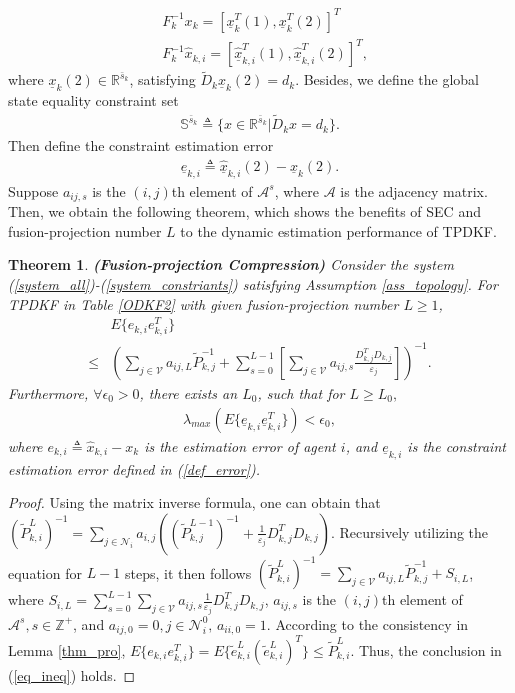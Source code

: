 \documentclass[journal,transmag]{IEEEtran}
\newtheorem{theorem}{\textbf{Theorem}}
\begin{document}
{\begin{align*}
&F_{k}^{-1}x_{k}=[\underline x_{k}^T(1),\underline x_{k}^T(2)]^T\\
&F_{k}^{-1}\hat x_{k,i}=[\underline {\hat x}_{k,i}^T(1),\underline {\hat x}_{k,i}^T(2)]^T,
\end{align*}
where $\underline x_{k}(2)\in\mathbb{R}^{\bar s_k}$, satisfying $\tilde D_{k}\underline x_{k}(2)= d_k$.
Besides, we define the  global state equality constraint set
\begin{align}\label{eq_space}
\mathbb{S}^{\bar s_k}\triangleq\{x\in\mathbb{R}^{\bar s_k}|\tilde D_{k}x= d_k\}.
\end{align}
Then define the constraint estimation error  
\begin{align}\label{def_error}
\underline e_{k,i}\triangleq \underline {\hat x}_{k,i}(2)-\underline x_{k}(2).
\end{align}
	Suppose $a_{ij,s}$ is the $(i,j)$th element of $\mathcal{A}^s$, where $\mathcal{A}$ is the adjacency matrix. Then, we obtain the following theorem, which shows the benefits of SEC and fusion-projection number $L$ to the dynamic estimation performance of TPDKF. 
	\begin{theorem}\label{prop_const} 
		\textbf{(Fusion-projection Compression)}
		Consider the system (\ref{system_all})-(\ref{system_constriants})  satisfying Assumption \ref{ass_topology}. For  TPDKF in Table \ref{ODKF2} with given fusion-projection number $L\geq 1$,  
				\begin{align}\label{eq_ineq}
				&E\{e_{k,i} e_{k,i}^T\}\\
				\leq &\left(\sum_{j\in\mathcal{V}}a_{ij,L}\tilde{P}_{k,j}^{-1}+\sum_{s=0}^{L-1}\left[\sum_{j\in \mathcal{V}}a_{ij,s}\frac{D_{k,j}^TD_{k,j}}{\varepsilon_j}\right]\right)^{-1}.\nonumber
				\end{align}
	Furthermore, $\forall\epsilon_0>0$, there exists an $L_0$, such that for $L\geq L_0,$
		\begin{align}\label{eq_small}
	\lambda_{max}\left(E\{\underline e_{k,i}\underline e_{k,i}^T\}\right)< \epsilon_0,
		\end{align}					
	where $e_{k,i}\triangleq\hat x_{k,i}-x_{k}$ is the estimation error of agent $i$, and $\underline e_{k,i}$ is the constraint estimation error defined in (\ref{def_error}).
	\end{theorem}	
	\begin{proof}
 Using the matrix inverse formula, one can obtain that $(\tilde P_{k,i}^{L})^{-1}=\sum_{j\in \mathcal{N}_{i}}a_{i,j}((\tilde P_{k,j}^{L-1})^{-1}+\frac{1}{\varepsilon_j}D_{k,j}^TD_{k,j})$.
 Recursively utilizing  the equation for $L-1$ steps, it then follows $(\tilde P_{k,i}^{L})^{-1}=\sum_{j\in \mathcal{V}}a_{ij,L}\tilde P_{k,j}^{-1}+S_{i,L}$,
 where $S_{i,L}=\sum_{s=0}^{L-1}\sum_{j\in \mathcal{V}}a_{ij,s}\frac{1}{\varepsilon_j}D_{k,j}^TD_{k,j}$,  $a_{ij,s}$ is the $(i,j)$th element of $\mathcal{A}^s,s\in\mathbb{Z}^+$, and  $a_{ij,0}=0,j\in \mathcal{N}_{i}^0,\, a_{ii,0}=1.$   
 According to the consistency in Lemma \ref{thm_pro}, $E\{e_{k,i} e_{k,i}^T\}=E\{\tilde e_{k,i}^L(\tilde e_{k,i}^L) ^T\}\leq \tilde P_{k,i}^{L}$. Thus, the conclusion in (\ref{eq_ineq}) holds.



\end{proof}}
\end{document}
